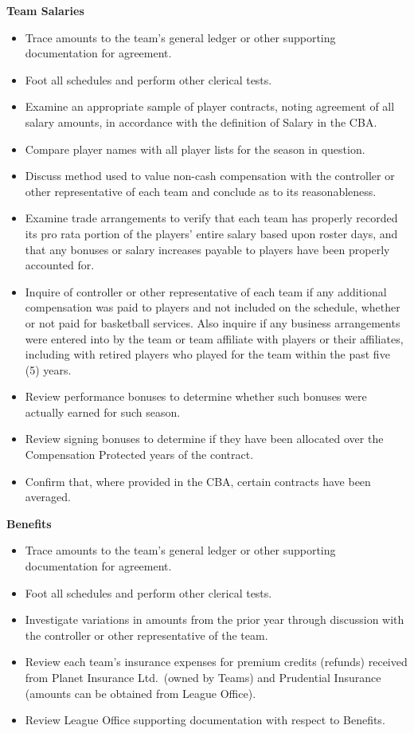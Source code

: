 \documentclass[
]{book}
\providecommand{\tightlist}{%
  \setlength{\itemsep}{0pt}\setlength{\parskip}{0pt}}
\begin{document}
\textbf{Team Salaries}

\begin{itemize}
\tightlist
\item
  Trace amounts to the team's general ledger or other supporting documentation for agreement.
\item
  Foot all schedules and perform other clerical tests.
\item
  Examine an appropriate sample of player contracts, noting agreement of all salary amounts, in accordance with the definition of Salary in the CBA.
\item
  Compare player names with all player lists for the season in question.
\item
  Discuss method used to value non-cash compensation with the controller or other representative of each team and conclude as to its reasonableness.
\item
  Examine trade arrangements to verify that each team has properly recorded its pro rata portion of the players' entire salary based upon roster days, and that any bonuses or salary increases payable to players have been properly accounted for.
\item
  Inquire of controller or other representative of each team if any additional compensation was paid to players and not included on the schedule, whether or not paid for basketball services. Also inquire if any business arrangements were entered into by the team or team affiliate with players or their affiliates, including with retired players who played for the team within the past five (5) years.
\item
  Review performance bonuses to determine whether such bonuses were actually earned for such season.
\item
  Review signing bonuses to determine if they have been allocated over the Compensation Protected years of the contract.
\item
  Confirm that, where provided in the CBA, certain contracts have been averaged.
\end{itemize}

\textbf{Benefits}

\begin{itemize}
\tightlist
\item
  Trace amounts to the team's general ledger or other supporting documentation for agreement.
\item
  Foot all schedules and perform other clerical tests.
\item
  Investigate variations in amounts from the prior year through discussion with the controller or other representative of the team.
\item
  Review each team's insurance expenses for premium credits (refunds) received from Planet Insurance Ltd.~(owned by Teams) and Prudential Insurance (amounts can be obtained from League Office).
\item
  Review League Office supporting documentation with respect to Benefits.
\end{itemize}
\end{document}
